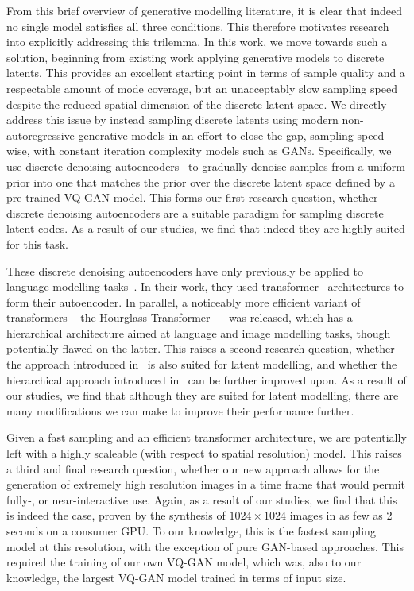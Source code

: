 From this brief overview of generative modelling literature, it is clear that
indeed no single model satisfies all three conditions. This therefore motivates
research into explicitly addressing this trilemma. In this work, we move towards
such a solution, beginning from existing work applying generative models to
discrete latents. This provides an excellent starting point in terms of sample
quality and a respectable amount of mode coverage, but an unacceptably slow
sampling speed despite the reduced spatial dimension of the discrete latent
space. We directly address this issue by instead sampling discrete latents using
modern non-autoregressive generative models in an effort to close the gap,
sampling speed wise, with constant iteration complexity models such as GANs.
Specifically, we use discrete denoising
autoencoders~\cite{savinov2022stepunrolled} to gradually denoise samples from a
uniform prior into one that matches the prior over the discrete latent space
defined by a pre-trained VQ-GAN model. This forms our first research question,
whether discrete denoising autoencoders are a suitable paradigm for sampling
discrete latent codes. As a result of our studies, we find that indeed they are
highly suited for this task.

These discrete denoising autoencoders have only previously be applied to
language modelling tasks~\cite{savinov2022stepunrolled}. In their work, they
used transformer~\cite{vaswani2017attention} architectures to form their
autoencoder. In parallel, a noticeably more efficient variant of transformers --
the Hourglass Transformer~\cite{nawrot2021hierarchical} -- was released, which
has a hierarchical architecture aimed at language and image modelling tasks,
though potentially flawed on the latter. This raises a second research question,
whether the approach introduced in~\citet{savinov2022stepunrolled} is also
suited for latent modelling, and whether the hierarchical approach introduced
in~\citet{nawrot2021hierarchical} can be further improved upon. As a result of
our studies, we find that although they are suited for latent modelling, there
are many modifications we can make to improve their performance further.

Given a fast sampling and an efficient transformer architecture, we are
potentially left with a highly scaleable (with respect to spatial resolution)
model. This raises a third and final research question, whether our new approach
allows for the generation of extremely high resolution images in a time frame
that would permit fully-, or near-interactive use. Again, as a result of our
studies, we find that this is indeed the case, proven by the synthesis of $1024
\times 1024$ images in as few as 2 seconds on a consumer GPU. To our knowledge,
this is the fastest sampling model at this resolution, with the exception of
pure GAN-based approaches. This required the training of our own VQ-GAN model,
which was, also to our knowledge, the largest VQ-GAN model trained in terms of
input size.

